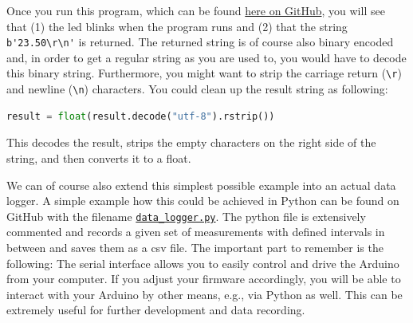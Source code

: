 Once you run this program, which can be found \href{https://github.com/galactic-forensics/workshop_arduino_electronics/blob/main/further_examples/data_logger/simple_query.py}{here on GitHub}, you will see that (1) the \ac{led} blinks when the program runs and (2) that the string \lstinline{b'23.50\r\n'} is returned. The returned string is of course also binary encoded and, in order to get a regular string as you are used to, you would have to decode this binary string. Furthermore, you might want to strip the carriage return (\lstinline{\r}) and newline (\lstinline{\n}) characters. You could clean up the result string as following:
\begin{lstlisting}[language=python]
result = float(result.decode("utf-8").rstrip())
\end{lstlisting}
This decodes the result, strips the empty characters on the right side of the string, and then converts it to a float. 

We can of course also extend this simplest possible example into an actual data logger. A simple example how this could be achieved in Python can be found on GitHub with the filename \href{https://github.com/galactic-forensics/workshop_arduino_electronics/blob/main/further_examples/data_logger/data_logger.py}{\lstinline{data_logger.py}}. The python file is extensively commented and records a given set of measurements with defined intervals in between and saves them as a \ac{csv} file. The important part to remember is the following: The serial interface allows you to easily control and drive the Arduino from your computer. If you adjust your firmware accordingly, you will be able to interact with your Arduino by other means, e.g., via Python as well. This can be extremely useful for further development and data recording.